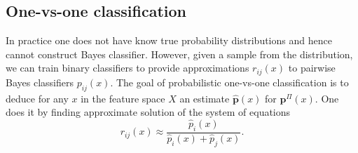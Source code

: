 \documentclass[twoside,11pt]{article}
\begin{document}
\subsection{One-vs-one classification }


In practice one does not have know true probability distributions and hence cannot construct Bayes classifier. However, given a sample from the distribution, we can train binary classifiers to provide approximations $r_{ij}(x)$ to pairwise Bayes classifiers $p_{ij}(x)$. The goal of probabilistic one-vs-one classification is to deduce for any $x$ in the feature space $X$ an estimate $\hat{\boldsymbol{p}}(x)$ for $\boldsymbol{p}^\Pi(x)$. One does it by finding approximate solution of the system of equations
%
%
%
%
%
%
%
%
\begin{equation}
	{r}_{ij}(x) \approx \frac {\hat p_i(x)}{\hat p_i(x) + \hat p_j(x)}. \label{eq:bt2}
\end{equation}

\end{document}
